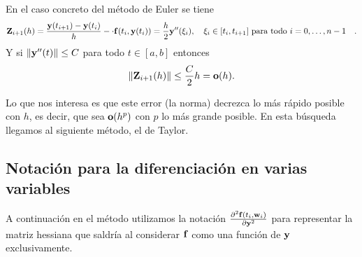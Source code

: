 

\begin{example}
    En el caso concreto del método de Euler se tiene
    \begin{equation*}
        \ELT_{i+1}(h) =
        \frac{\vy(t_{i+1}) - \vy(t_i)}{h} - \cdot \vf(t_i,\vy(t_i)) =
        \frac{h}{2} \vy''(\xi_i),
            \qq{$\xi_i \in [t_i, t_{i+1}]$ para todo $i=0,\dots, n-1$}.
    \end{equation*}
    Y si $\norm{\vb{y}{}''(t)} \le C$ para todo $t \in [a, b]$ entonces
    \begin{equation*}
        \norm{\vb{Z}{}_{i+1}(h)} \le \frac{C}{2}h = \vb{o}{}(h).
    \end{equation*}

    Lo que nos interesa es que este error (la norma)
    decrezca lo más rápido posible con $h$,
    es decir, que sea $\vb{o}{}(h^p)$ con $p$ lo más grande posible.
    En esta búsqueda llegamos al siguiente método, el de Taylor.
\end{example}

\subsection{Notación para la diferenciación en varias variables}

A continuación en el método utilizamos la notación
$\pdv[2]{\vb{f}{}(t_i, \vb{w}{}_i)}{\vb{y}{}}$
para representar la matriz hessiana que saldría al considerar $\vb{f}{}$
como una función de $\vb{y}{}$ exclusivamente.


